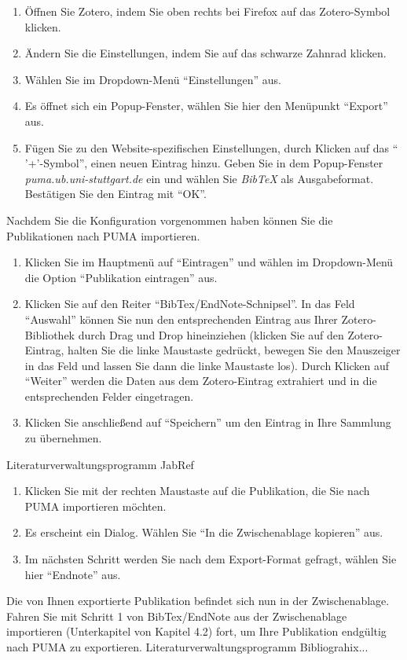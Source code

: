 \documentclass[a4paper,11pt,twoside]{scrbook}
\begin{document}
\begin{enumerate}
    \item Öffnen Sie Zotero, indem Sie oben rechts bei Firefox auf das Zotero-Symbol klicken.
    \item Ändern Sie die Einstellungen, indem Sie auf das schwarze Zahnrad klicken. 
    \item Wählen Sie im Dropdown-Menü \enquote{Einstellungen} aus.
    \item Es öffnet sich ein Popup-Fenster, wählen Sie hier den Menüpunkt \enquote{Export} aus. 
    \item Fügen Sie zu den Website-spezifischen Einstellungen, durch Klicken auf das \enquote{ '+'-Symbol}, einen neuen Eintrag hinzu. Geben Sie in dem Popup-Fenster \textit{puma.ub.uni-stuttgart.de} ein und wählen Sie \textit{BibTeX} als Ausgabeformat. Bestätigen Sie den Eintrag mit \enquote{OK}. 
\end{enumerate}
Nachdem Sie die Konfiguration vorgenommen haben können Sie die Publikationen nach PUMA importieren. 
\begin{enumerate}
    \item Klicken Sie im Hauptmenü auf \enquote{Eintragen} und wählen im Dropdown-Menü die Option \enquote{Publikation eintragen} aus.  
    \item Klicken Sie auf den Reiter \enquote{BibTex/EndNote-Schnipsel}. In das Feld \enquote{Auswahl} können Sie nun den entsprechenden Eintrag aus Ihrer Zotero-Bibliothek durch Drag und Drop hineinziehen (klicken Sie auf den Zotero-Eintrag, halten Sie die linke Maustaste gedrückt, bewegen Sie den Mauszeiger in das Feld und lassen Sie dann die linke Maustaste los). Durch Klicken auf \enquote{Weiter} werden die Daten aus dem Zotero-Eintrag extrahiert und in die entsprechenden Felder eingetragen. 
    \item Klicken Sie anschließend auf \enquote{Speichern} um den Eintrag in Ihre Sammlung zu übernehmen.
\end{enumerate}  
Literaturverwaltungsprogramm JabRef
\begin{enumerate}
    \item Klicken Sie mit der rechten Maustaste auf die Publikation, die Sie nach PUMA importieren möchten.
    \item Es erscheint ein Dialog. Wählen Sie \enquote{In die Zwischenablage kopieren} aus.
    \item Im nächsten Schritt werden Sie nach dem Export-Format gefragt, wählen Sie hier \enquote{Endnote} aus.
\end{enumerate}
Die von Ihnen exportierte Publikation befindet sich nun in der Zwischenablage. Fahren Sie mit Schritt 1 von BibTex/EndNote aus der Zwischenablage importieren (Unterkapitel von Kapitel 4.2) fort, um Ihre Publikation endgültig nach PUMA zu exportieren.\newline
\newline
Literaturverwaltungsprogramm Bibliograhix...
\end{document}
